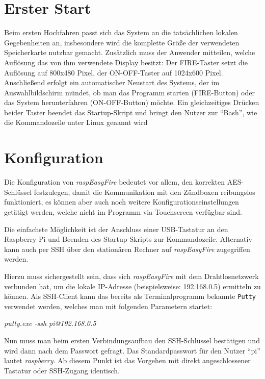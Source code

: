 \documentclass[paper=a4, parskip, numbers=noenddot, toc=listof, headsepline]{scrbook}
\newcommand{\REF}{\emph{raspEasyFire}}
\begin{document}
		\section{Erster Start}

			Beim ersten Hochfahren passt sich das System an die tatsächlichen lokalen Gegebenheiten an, insbesondere wird die komplette Größe der verwendeten Speicherkarte nutzbar gemacht. Zusätzlich muss der Anwender mitteilen, welche Auflösung das von ihm verwendete Display besitzt: Der FIRE-Taster setzt die Auflösung auf 800x480 Pixel, der ON-OFF-Taster auf 1024x600 Pixel. Anschließend erfolgt ein automatischer Neustart des Systems, der im Auswahlbildschirm mündet, ob man das Programm starten (FIRE-Button) oder das System herunterfahren (ON-OFF-Button) möchte. Ein gleichzeitiges Drücken beider Taster beendet das Startup-Skript und bringt den Nutzer zur \enquote{Bash}, wie die Kommandozeile unter Linux genannt wird

		\section{Konfiguration}

			Die Konfiguration von {\REF} bedeutet vor allem, den korrekten AES-Schlüssel festzulegen, damit die Kommunikation mit den Zündboxen reibungslos funktioniert, es können aber auch noch weitere Konfigurationseinstellungen getätigt werden, welche nicht im Programm via Touchscreen verfügbar sind.

			Die einfachste Möglichkeit ist der Anschluss einer USB-Tastatur an den Raspberry Pi und Beenden des Startup-Skripts zur Kommandozeile. Alternativ kann auch per SSH über den stationären Rechner auf {\REF} zugegriffen werden.

			Hierzu muss sichergestellt sein, dass sich {\REF} mit dem Drahtlosnetzwerk verbunden hat, um die lokale IP-Adresse (beispielsweise: 192.168.0.5) ermitteln zu können. Als SSH-Client kann das bereits als Terminalprogramm bekannte \texttt{Putty} verwendet werden, welches man mit folgenden Parametern startet:
			\begin{center}
				\emph{putty.exe -ssh pi@192.168.0.5}
			\end{center}

			Nun muss man beim ersten Verbindungsaufbau den SSH-Schlüssel bestätigen und wird dann nach dem Passwort gefragt. Das Standardpasswort für den Nutzer \enquote{pi} lautet \emph{raspberry}. Ab diesem Punkt ist das Vorgehen mit direkt angeschlossener Tastatur oder SSH-Zugang identisch.
\end{document}
